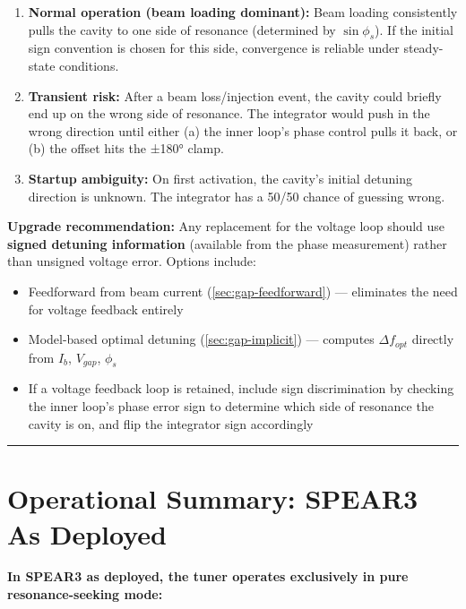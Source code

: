 \begin{enumerate}
\def\labelenumi{\arabic{enumi}.}
\tightlist
\item
  \textbf{Normal operation (beam loading dominant):} Beam loading consistently pulls the cavity to one side of resonance (determined by \(\sin\phi_s\)). If the initial sign convention is chosen for this side, convergence is reliable under steady-state conditions.
\item
  \textbf{Transient risk:} After a beam loss/injection event, the cavity could briefly end up on the wrong side of resonance. The integrator would push in the wrong direction until either (a) the inner loop's phase control pulls it back, or (b) the offset hits the ±180° clamp.
\item
  \textbf{Startup ambiguity:} On first activation, the cavity's initial detuning direction is unknown. The integrator has a 50/50 chance of guessing wrong.
\end{enumerate}

\textbf{Upgrade recommendation:} Any replacement for the voltage loop should use \textbf{signed detuning information} (available from the phase measurement) rather than unsigned voltage error. Options include:

\begin{itemize}
\tightlist
\item
  Feedforward from beam current (\cref{sec:gap-feedforward}) --- eliminates the need for voltage feedback entirely
\item
  Model-based optimal detuning (\cref{sec:gap-implicit}) --- computes \(\Delta f_{opt}\) directly from \(I_b\), \(V_{gap}\), \(\phi_s\)
\item
  If a voltage feedback loop is retained, include sign discrimination by checking the inner loop's phase error sign to determine which side of resonance the cavity is on, and flip the integrator sign accordingly
\end{itemize}

\begin{center}\rule{0.5\linewidth}{0.5pt}\end{center}

\section{Operational Summary: SPEAR3 As Deployed}\label{sec:operational}


\textbf{In SPEAR3 as deployed, the tuner operates exclusively in pure resonance-seeking mode:}


